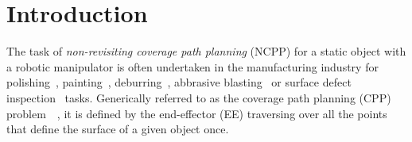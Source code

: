 \documentclass[letterpaper,journal]{IEEEtran}
\begin{document}


\section{Introduction}

% 
% 
% 
% 

The task of \textit{non-revisiting coverage path planning} (NCPP) for a static object with a robotic manipulator is often undertaken in the manufacturing industry for polishing~\cite{tian2016polishing}, painting~\cite{li2011painting}, deburring~\cite{xie2016grinding}, abbrasive blasting~\cite{Hassan2018Collaboration} or surface defect inspection~\cite{molina2017defects} tasks. 
Generically referred to as the coverage path planning (CPP) problem~\cite{choset2001coverage}~\cite{galceran2013a}, it is defined by the end-effector (EE) traversing over all the points that define the surface of a given object once.
\end{document}
